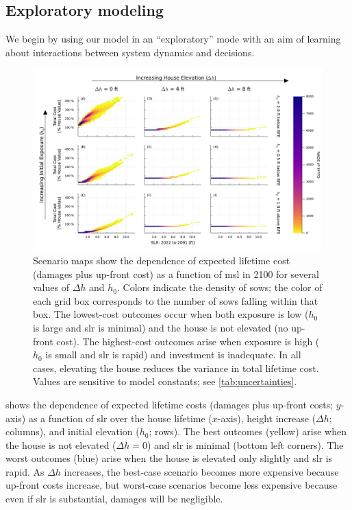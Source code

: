 \documentclass[11pt]{article}
\begin{document}
\subsection{Exploratory modeling}\label{sec:results-exploratory}

We begin by using our model in an ``exploratory'' mode with an aim of learning about interactions between system dynamics and decisions.

\begin{figure}
    \includegraphics[width=\textwidth]{scenario-map-slr-cost}
    \caption{
        Scenario maps show the dependence of expected lifetime cost (damages plus up-front cost) as a function of \gls{msl} in 2100 for several values of $\Delta h$ and $h_0$.
        Colors indicate the density of \glspl{sow}; the color of each grid box corresponds to the number of \glspl{sow} falling within that box.
        The lowest-cost outcomes occur when both exposure is low ($h_0$ is large and \gls{slr} is minimal) and the house is not elevated (no up-front cost).
        The highest-cost outcomes arise when exposure is high ($h_0$ is small and \gls{slr} is rapid) and investment is inadequate.
        In all cases, elevating the house reduces the variance in total lifetime cost.
        Values are sensitive to model constants; see \cref{tab:uncertainties}.
    }\label{fig:scenario-map-slr-cost}
\end{figure}

 shows the dependence of expected lifetime costs (damages plus up-front costs; $y$-axis) as a function of  \gls{slr} over the house lifetime ($x$-axis), height increase ($\Delta h$; columns), and initial elevation ($h_0$; rows).
The best outcomes (yellow) arise when the house is not elevated ($\Delta h = 0$) and \gls{slr} is minimal (bottom left corners).
The worst outcomes (blue) arise when the house is elevated only slightly and \gls{slr} is rapid.
As $\Delta h$ increases, the best-case scenario becomes more expensive because up-front costs increase, but worst-case scenarios become less expensive because even if \gls{slr} is substantial, damages will be negligible.
\end{document}
